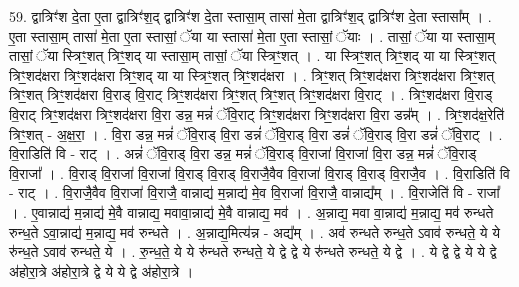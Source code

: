 \documentclass[17pt]{extarticle}
\begin{document}
59. द्वात्रिꣳ॑श दे॒ता ए॒ता द्वात्रिꣳ॑श॒द् द्वात्रिꣳ॑श दे॒ता स्तासा॒म् तासा॑ मे॒ता द्वात्रिꣳ॑श॒द् द्वात्रिꣳ॑श दे॒ता स्तासा᳚म् । . ए॒ता स्तासा॒म् तासा॑ मे॒ता ए॒ता स्तासां॒ ॅया या स्तासा॑ मे॒ता ए॒ता स्तासां॒ ॅयाः । . तासां॒ ॅया या स्तासा॒म् तासां॒ ॅया स्त्रिꣳ॒॒शत् त्रिꣳ॒॒शद् या स्तासा॒म् तासां॒ ॅया स्त्रिꣳ॒॒शत् । . या स्त्रिꣳ॒॒शत् त्रिꣳ॒॒शद् या या स्त्रिꣳ॒॒शत् त्रिꣳ॒॒शद॑क्षरा त्रिꣳ॒॒शद॑क्षरा त्रिꣳ॒॒शद् या या स्त्रिꣳ॒॒शत् त्रिꣳ॒॒शद॑क्षरा । . त्रिꣳ॒॒शत् त्रिꣳ॒॒शद॑क्षरा त्रिꣳ॒॒शद॑क्षरा त्रिꣳ॒॒शत् त्रिꣳ॒॒शत् त्रिꣳ॒॒शद॑क्षरा वि॒राड् वि॒राट् त्रिꣳ॒॒शद॑क्षरा त्रिꣳ॒॒शत् त्रिꣳ॒॒शत् त्रिꣳ॒॒शद॑क्षरा वि॒राट् । . त्रिꣳ॒॒शद॑क्षरा वि॒राड् वि॒राट् त्रिꣳ॒॒शद॑क्षरा त्रिꣳ॒॒शद॑क्षरा वि॒रा डन्न॒ मन्नं॑ ॅवि॒राट् त्रिꣳ॒॒शद॑क्षरा त्रिꣳ॒॒शद॑क्षरा वि॒रा डन्न᳚म् । . त्रिꣳ॒॒शद॑क्ष॒रेति॑ त्रिꣳ॒॒शत् - अ॒क्ष॒रा॒ । . वि॒रा डन्न॒ मन्नं॑ ॅवि॒राड् वि॒रा डन्नं॑ ॅवि॒राड् वि॒रा डन्नं॑ ॅवि॒राड् वि॒रा डन्नं॑ ॅवि॒राट् । . वि॒राडिति॑ वि - राट् । . अन्नं॑ ॅवि॒राड् वि॒रा डन्न॒ मन्नं॑ ॅवि॒राड् वि॒राजा॑ वि॒राजा॑ वि॒रा डन्न॒ मन्नं॑ ॅवि॒राड् वि॒राजा᳚ । . वि॒राड् वि॒राजा॑ वि॒राजा॑ वि॒राड् वि॒राड् वि॒राजै॒वैव वि॒राजा॑ वि॒राड् वि॒राड् वि॒राजै॒व । . वि॒राडिति॑ वि - राट् । . वि॒राजै॒वैव वि॒राजा॑ वि॒राजै॒ वान्नाद्य॑ म॒न्नाद्य॑ मे॒व वि॒राजा॑ वि॒राजै॒ वान्नाद्य᳚म् । . वि॒राजेति॑ वि - राजा᳚ । . ए॒वान्नाद्य॑ म॒न्नाद्य॑ मे॒वै वान्नाद्य॒ मवावा॒न्नाद्य॑ मे॒वै वान्नाद्य॒ मव॑ । . अ॒न्नाद्य॒ मवा वा॒न्नाद्य॑ म॒न्नाद्य॒ मव॑ रुन्धते रुन्ध॒ते ऽवा॒न्नाद्य॑ म॒न्नाद्य॒ मव॑ रुन्धते । . अ॒न्नाद्य॒मित्य॑न्न - अद्य᳚म् । . अव॑ रुन्धते रुन्ध॒ते ऽवाव॑ रुन्धते॒ ये ये रु॑न्ध॒ते ऽवाव॑ रुन्धते॒ ये । . रु॒न्ध॒ते॒ ये ये रु॑न्धते रुन्धते॒ ये द्वे द्वे ये रु॑न्धते रुन्धते॒ ये द्वे । . ये द्वे द्वे ये ये द्वे अ॑होरा॒त्रे अ॑होरा॒त्रे द्वे ये ये द्वे अ॑होरा॒त्रे । \newline
\end{document}
